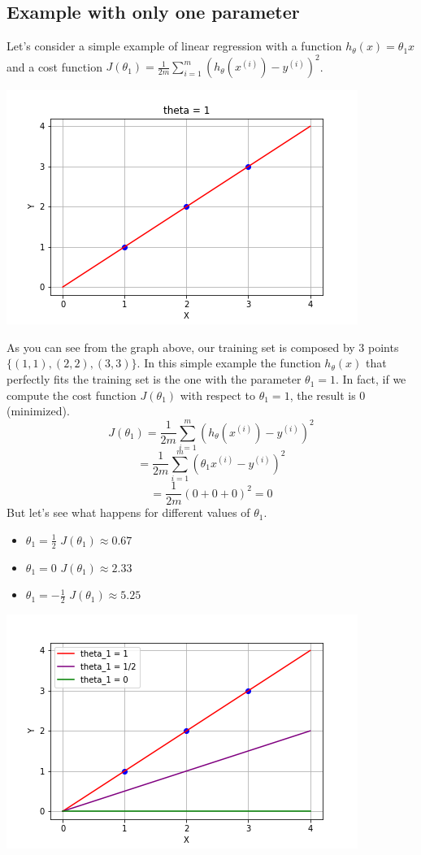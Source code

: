 \subsection{Example with only one parameter}
Let's consider a simple example of linear regression with a function $h_{\theta}(x) = \theta_{1}x$ and a cost function $J(\theta_{1}) = \frac{1}{2m}\sum_{i = 1}^{m}(h_{\theta}(x^{(i)}) - y^{(i)})^{2}$.
\begin{center}
    \includegraphics[scale = 0.7]{images/Simple liner reg.png}
\end{center}
As you can see from the graph above, our training set is composed by 3 points $\{(1,1), (2,2), (3,3)\}$. In this simple example the function $h_{\theta}(x)$ that perfectly fits the training set is the one with the parameter $\theta_{1} = 1$. In fact, if we compute the cost function $J(\theta_{1})$ with respect to $\theta_{1} = 1$, the result is 0 (minimized).
\[J(\theta_{1}) = \frac{1}{2m}\sum_{i = 1}^{m}(h_{\theta}(x^{(i)}) - y^{(i)})^{2}\]
\[= \frac{1}{2m}\sum_{i = 1}^{m}(\theta_{1}x^{(i)} - y^{(i)})^{2}\]
\[= \frac{1}{2m}(0+0+0)^2 = 0\]
But let's see what happens for different values of $\theta_{1}$.
\begin{itemize}
    \item $\theta_{1} = \frac{1}{2}$ $J(\theta_{1}) \approx 0.67$
    \item $\theta_{1} = 0$ $J(\theta_{1}) \approx 2.33$
    \item $\theta_{1} = -\frac{1}{2}$ $J(\theta_{1}) \approx 5.25$
\end{itemize}
\begin{center}
    \includegraphics[scale = 0.7]{images/Simple liner reg (colors).png}
\end{center}
